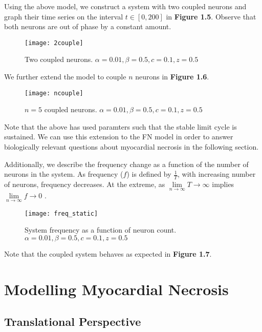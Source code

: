 \documentclass[11pt]{report}
\begin{document}
Using the above model, we construct a system with two coupled neurons and graph their time series on the interval $t \in [0,200]$ in \textbf{Figure 1.5}. Observe that both neurons are out of phase by a constant amount.


\begin{figure}[!ht]
  \caption{Two coupled neurons. $\alpha = 0.01, \beta = 0.5,c = 0.1, z = 0.5$}
  \centering
    \texttt{[image: 2couple]}
\end{figure}

We further extend the model to couple $n$ neurons in \textbf{Figure 1.6}. 

\begin{figure}[!ht]
  \caption{$n=5$ coupled neurons. $\alpha = 0.01, \beta = 0.5,c = 0.1, z = 0.5$ }
  \centering
    \texttt{[image: ncouple]}
\end{figure}

Note that the above has used paramters such that the stable limit cycle is sustained. We can use this extension to the FN model in order to answer biologically relevant questions about myocardial necrosis in the following section. 


Additionally, we describe the frequency change as a function of the number of neurons in the system. As frequency ($f$) is defined by $\frac{1}{T}$, with increasing number of neurons, frequency decreases. At the extreme, as $\lim\limits_{n \rightarrow \infty} T \rightarrow \infty$ implies $\lim\limits_{n \rightarrow \infty} f \rightarrow 0$ .



\begin{figure}[!ht]
  \caption{System frequency as a function of neuron count. $\alpha = 0.01, \beta = 0.5,c = 0.1,z=0.5$ }
  \centering
    \texttt{[image: freq\_static]}
\end{figure}

Note that the coupled system behaves as expected in \textbf{Figure 1.7}. 




\chapter{Modelling Myocardial Necrosis} 


\section{Translational Perspective} %
\end{document}
